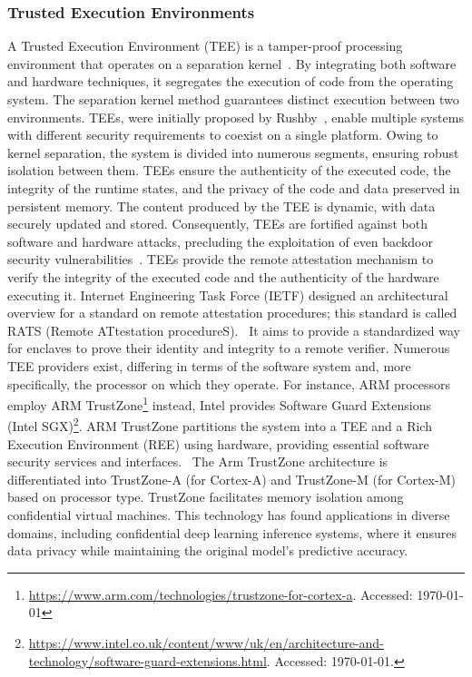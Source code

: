 \begin{newj}
\subsubsection{Trusted Execution Environments}
\label{sec:background:tee}
A Trusted Execution Environment (TEE) is a tamper-proof processing environment that operates on a separation kernel~\citep{mcgillion2015open}. By integrating both software and hardware techniques, it segregates the execution of code from the operating system. The separation kernel method guarantees distinct execution between two environments.
TEEs, were initially proposed by Rushby~\citet{rushby1981design}, enable multiple systems with different security requirements to coexist on a single platform. Owing to kernel separation, the system is divided into numerous segments, ensuring robust isolation between them.
TEEs ensure the authenticity of the executed code, the integrity of the runtime states, and the privacy of the code and data preserved in persistent memory. The content produced by the TEE is dynamic, with data securely updated and stored. Consequently, TEEs are fortified against both software and hardware attacks, precluding the exploitation of even backdoor security vulnerabilities~\citep{DBLP:conf/trustcom/SabtAB15}. TEEs provide the remote attestation mechanism to verify the integrity of the executed code and the authenticity of the hardware executing it. Internet Engineering Task Force (IETF) designed an architectural overview for a standard on remote attestation procedures; this standard is called RATS (Remote ATtestation procedureS).~\cite{rfc9334} It aims to provide a standardized way for enclaves to prove their identity and integrity to a remote verifier. Numerous TEE providers exist, differing in terms of the software system and, more specifically, the processor on which they operate. For instance, ARM processors employ ARM TrustZone\footnote{\url{https://www.arm.com/technologies/trustzone-for-cortex-a}. Accessed: \today} instead, Intel provides Software Guard Extensions (Intel SGX)\footnote{\url{https://www.intel.co.uk/content/www/uk/en/architecture-and-technology/software-guard-extensions.html}. Accessed: \today.}.
ARM TrustZone partitions the system into a TEE and a Rich Execution Environment (REE) using hardware, providing essential software security services and 
interfaces.~\cite{DBLP:journals/corr/abs-2306-11011} The Arm TrustZone architecture is differentiated into TrustZone-A (for Cortex-A) and TrustZone-M (for Cortex-M) based on processor type. TrustZone facilitates memory isolation among confidential virtual machines.\cite{DBLP:conf/cpsweek/SarkerITF23} This technology has found applications in diverse domains, including confidential deep learning inference systems, where it ensures data privacy while maintaining the original model's predictive accuracy.\cite{DBLP:conf/codaspy/IslamZKKH23} 

\end{newj}
